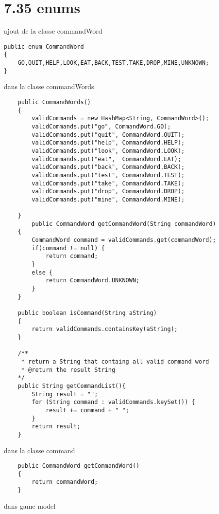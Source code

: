\documentclass[a4paper , 10pt]{article}
\begin{document}
\section{7.35 enums}
ajout de la classe commandWord
\begin{verbatim}
public enum CommandWord
{
    GO,QUIT,HELP,LOOK,EAT,BACK,TEST,TAKE,DROP,MINE,UNKNOWN;
}
\end{verbatim}
dans la classe commandWords
\begin{verbatim}
    public CommandWords()
    {
        validCommands = new HashMap<String, CommandWord>();
        validCommands.put("go", CommandWord.GO);
        validCommands.put("quit", CommandWord.QUIT);
        validCommands.put("help", CommandWord.HELP);
        validCommands.put("look", CommandWord.LOOK);
        validCommands.put("eat",  CommandWord.EAT);
        validCommands.put("back", CommandWord.BACK);
        validCommands.put("test", CommandWord.TEST);
        validCommands.put("take", CommandWord.TAKE);
        validCommands.put("drop", CommandWord.DROP);
        validCommands.put("mine", CommandWord.MINE);

    }
        public CommandWord getCommandWord(String commandWord)
    {
        CommandWord command = validCommands.get(commandWord);
        if(command != null) {
            return command;
        }
        else {
            return CommandWord.UNKNOWN;
        }
    }

    public boolean isCommand(String aString)
    {
        return validCommands.containsKey(aString);
    }

    /**
     * return a String that containg all valid command word
     * @return the result String
    */
    public String getCommandList(){
        String result = "";
        for (String command : validCommands.keySet()) {
            result += command + " ";
        }
        return result;
    }
\end{verbatim}
dans la classe command
\begin{verbatim}
    public CommandWord getCommandWord()
    {
        return commandWord;
    }
\end{verbatim}
dans game model
\end{document}
